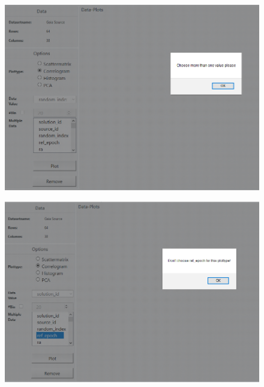 \documentclass{article}
\begin{document}
\begin{figure}[!h]
\centering
\includegraphics[width=1\textwidth]{images/m3/corr_err1.PNG}
\label{fig5}
\end{figure}
\newpage
\begin{figure}[!h]
\centering
\includegraphics[width=1\textwidth]{images/m3/corr_err2.PNG}
\label{fig6}
\end{figure}
\newpage
\end{document}
